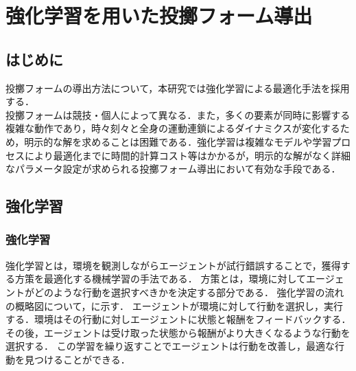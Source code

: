 \chapter[強化学習を用いた投擲フォーム導出]{強化学習を用いた投擲フォーム導出}

\section{はじめに}
投擲フォームの導出方法について，本研究では強化学習による最適化手法を採用する．\\
投擲フォームは競技・個人によって異なる．また，多くの要素が同時に影響する複雑な動作であり，時々刻々と全身の運動連鎖によるダイナミクスが変化するため，明示的な解を求めることは困難である．強化学習は複雑なモデルや学習プロセスにより最適化までに時間的計算コスト等はかかるが，明示的な解がなく詳細なパラメータ設定が求められる投擲フォーム導出において有効な手段である．

\section{強化学習}
\subsection{強化学習}
強化学習とは，環境を観測しながらエージェントが試行錯誤することで，獲得する方策を最適化する機械学習の手法である．
方策とは，環境に対してエージェントがどのような行動を選択すべきかを決定する部分である．
強化学習の流れの概略図について，に示す．
エージェントが環境に対して行動を選択し，実行する．環境はその行動に対しエージェントに状態と報酬をフィードバックする．
その後，エージェントは受け取った状態から報酬がより大きくなるような行動を選択する．
この学習を繰り返すことでエージェントは行動を改善し，最適な行動を見つけることができる．
